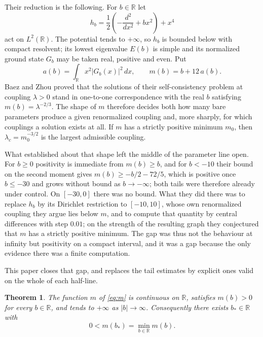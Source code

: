 \documentclass[11pt,reqno]{amsart}
\theoremstyle{plain}
\newtheorem{theorem}{Theorem}[section]
\theoremstyle{definition}
\theoremstyle{remark}
\numberwithin{equation}{section}
\begin{document}
Their reduction is the following. For $b\in\mathbb R$ let
\begin{equation}
  \label{eq:hb}
  h_b=\frac12\left(-\frac{d^2}{dx^2}+bx^2\right)+x^4
\end{equation}
act on $L^2(\mathbb R)$. The potential tends to $+\infty$, so $h_b$ is bounded
below with compact resolvent; its lowest eigenvalue $E(b)$ is simple and its
normalized ground state $G_b$ may be taken real, positive and even. Put
\begin{equation}
  \label{eq:m}
  a(b)=\int_{\mathbb R}x^2|G_b(x)|^2\,dx,
  \qquad
  m(b)=b+12\,a(b).
\end{equation}
Baez and Zhou proved that the solutions of their self-consistency problem at
coupling $\lambda>0$ stand in one-to-one correspondence with the real $b$
satisfying $m(b)=\lambda^{-2/3}$. The shape of $m$ therefore decides both how
many bare parameters produce a given renormalized coupling and, more sharply,
for which couplings a solution exists at all. If $m$ has a strictly positive
minimum $m_0$, then $\lambda_c=m_0^{-3/2}$ is the largest admissible coupling.

What \cite{baez1992renormalized} established about that shape left the middle
of the parameter line open. For $b\ge0$ positivity is immediate from
$m(b)\ge b$, and for $b<-10$ their bound on the second moment gives
$m(b)\ge-b/2-72/5$, which is positive once $b\le-30$ and grows without bound as
$b\to-\infty$; both tails were therefore already under control. On $[-30,0]$
there was no bound. What they did there was to replace $h_b$ by its Dirichlet
restriction to $[-10,10]$, whose own renormalized coupling they argue lies
below $m$, and to compute that quantity by central differences with step
$0.01$; on the strength of the resulting graph they conjectured that $m$ has a
strictly positive minimum. The gap was thus not the behaviour at infinity but
positivity on a compact interval, and it was a gap because the only evidence
there was a finite computation.

This paper closes that gap, and replaces the tail estimates by explicit ones
valid on the whole of each half-line.

\begin{theorem}
  \label{thm:main}
  The function $m$ of \eqref{eq:m} is continuous on $\mathbb R$, satisfies
  $m(b)>0$ for every $b\in\mathbb R$, and tends to $+\infty$ as
  $|b|\to\infty$. Consequently there exists $b_*\in\mathbb R$ with
  \begin{equation*}
    0<m(b_*)=\min_{b\in\mathbb R}m(b).
  \end{equation*}
\end{theorem}
\end{document}
